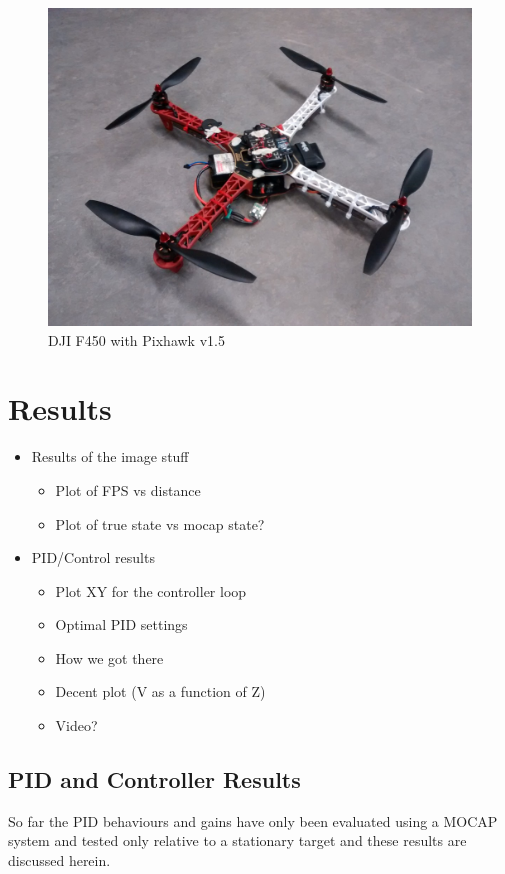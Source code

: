 \documentclass[11pt, twocolumn]{article}
\begin{document}
\begin{figure}[H]
	\centering
	\includegraphics[width=0.8\linewidth]{images/quadrotor.jpg}
	\caption{DJI F450 with Pixhawk v1.5}
	\label{Quadrotor}
\end{figure}


\section{Results}
\begin{itemize}
	\item Results of the image stuff
	\begin{itemize}
		\item Plot of FPS vs distance
		\item Plot of true state vs mocap state?
	\end{itemize}
	
	\item PID/Control results 
	\begin{itemize}
		\item Plot XY for the controller loop
		\item Optimal PID settings
		\item How we got there
		\item Decent plot (V as a function of Z)
		\item Video?
	\end{itemize}
	
\end{itemize}
\subsection{PID and Controller Results}

So far the PID behaviours and gains have only been evaluated using a MOCAP system and tested only relative to a stationary target and these results are discussed herein. 
\end{document}
